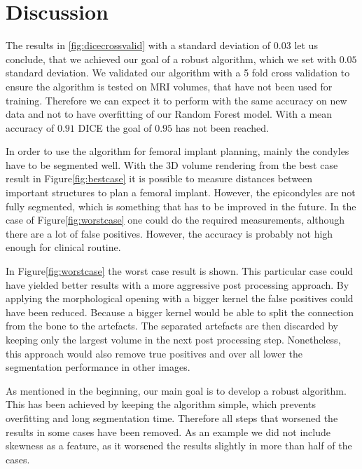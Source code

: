 \section{Discussion}
The results in \autoref{fig:dicecrossvalid} with a standard deviation of $0.03$ let us conclude, that we achieved our goal of a robust algorithm, which we set with $0.05$ standard deviation. We validated our algorithm with a 5 fold cross validation to ensure the algorithm is tested on MRI volumes, that have not been used for training. Therefore we can expect it to perform with the same accuracy on new data and not to have overfitting of our Random Forest model. With a mean accuracy of $0.91$ DICE the goal of $0.95$ has not been reached. 

In order to use the algorithm for femoral implant planning, mainly the condyles have to be segmented well. With the 3D volume rendering from the best case result in Figure\autoref{fig:bestcase} it is possible to measure distances between important structures to plan a femoral implant. However, the epicondyles are not fully segmented, which is something that has to be improved in the future. In the case of Figure\autoref{fig:worstcase} one could do the required measurements, although there are a lot of false positives. However, the accuracy is probably not high enough for clinical routine.

In Figure\autoref{fig:worstcase} the worst case result is shown. This particular case could have yielded better results with a more aggressive post processing approach. By applying the morphological opening with a bigger kernel the false positives could have been reduced. Because a bigger kernel would be able to split the connection from the bone to the artefacts. The separated artefacts are then discarded by keeping only the largest volume in the next post processing step. Nonetheless, this approach would also remove true positives and over all lower the segmentation performance in other images. 

As mentioned in the beginning, our main goal is to develop a robust algorithm. This has been achieved by keeping the algorithm simple, which prevents overfitting and long segmentation time. Therefore all steps that worsened the results in some cases have been removed. As an example we did not include skewness as a feature, as it worsened the results slightly in more than half of the cases.
